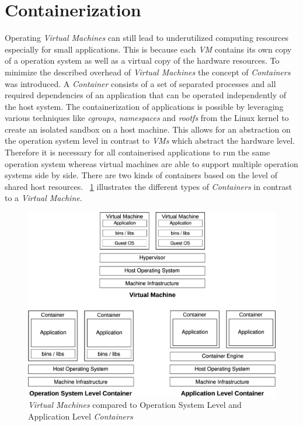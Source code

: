 \section{Containerization}
Operating \textit{Virtual Machines} can still lead to underutilized computing resources especially for small applications.
This is because each \textit{VM} contains its own copy of a operation system as well as a virtual copy of the hardware resources.
To minimize the described overhead of \textit{Virtual Machines} the concept of \textit{Containers} was introduced.
A \textit{Container} consists of a set of separated processes and all required dependencies of an application that can be operated independently of the host system.
The containerization of applications is possible by leveraging various techniques like \textit{cgroups}, \textit{namespaces} and \textit{rootfs} from the Linux kernel to create an isolated sandbox on a host machine.
This allows for an abstraction on the operation system level in contrast to \textit{VMs} which abstract the hardware level.
Therefore it is necessary for all containerised applications to run the same operation system whereas virtual machines are able to support multiple operation systems side by side.
There are two kinds of containers based on the level of shared host resources.
~\cref{fig:container_levels} illustrates the different types of \textit{Containers} in contrast to a \textit{Virtual Machine}.
\begin{figure}[]
    \centering
    \includegraphics[width=\textwidth]{graphics/virtualization.svg}
    \caption{\textit{Virtual Machines} compared to Operation System Level and Application Level \textit{Containers}~\cite{docker1}}
    \label{fig:container_levels}
\end{figure}

